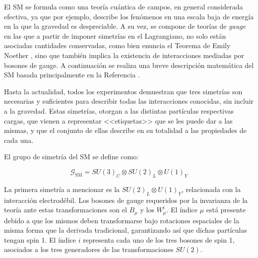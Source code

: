 El SM se formula como una teoría cuántica de campos, en general considerada efectiva, ya que por ejemplo, describe los fenómenos en una escala baja de energía en la que la gravedad es despreciable. A su vez, se compone de teorías de \textit{gauge} en las que a partir de imponer simetrías en el Lagrangiano, no solo están asociadas cantidades conservadas, como bien enuncia el Teorema de Emily Noether \cite{Noether1918}, sino que también implica la existencia de interacciones mediadas por bosones de gauge. A continuación se realiza una breve descripción matemática del SM basada principalmente en la Referencia \cite{gkane}.

Hasta la actualidad, todos los experimentos demuestran que tres simetrías son necesarias y suficientes para describir todas las interacciones conocidas, sin incluir a la gravedad. Estas simetrías, otorgan a las distintas partículas respectivas cargas, que vienen a representar <<etiquetas>> que se les puede dar a las mismas, y que el conjunto de ellas describe en su totalidad a las propiedades de cada una.

El grupo de simetría del SM se define como:

\begin{equation}
	\mathcal{G}_{\text{SM}} = SU(3)_C \otimes SU(2)_L \otimes U(1)_Y
\end{equation}

La primera simetría a mencionar es la $SU(2)_L \otimes U(1)_Y$, relacionada con la interacción electrodébil. Los bosones de gauge requeridos por la invarianza de la teoría ante estas transformaciones son el $B_{\mu}$ y los $W_{\mu}^{i}$. El índice $\mu$ está presente debido a que los mismos deben transformarse bajo rotaciones espaciales de la misma forma que la derivada tradicional, garantizando así que dichas partículas tengan spin 1. El índice $i$ representa cada uno de los tres bosones de spin 1, asociados a los tres generadores de las transformaciones $SU(2)$.


